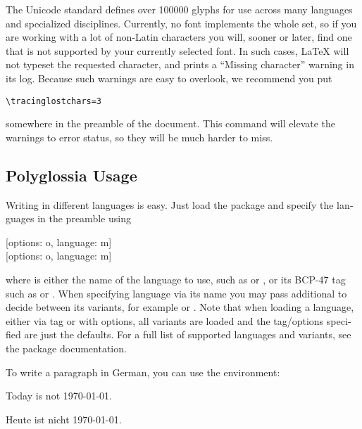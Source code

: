 The Unicode standard defines over \num{100 000} glyphs for use across many
languages and specialized disciplines. Currently, no font implements the whole
set, so if you are working with a lot of non-Latin characters you will, sooner
or later, find one that is not supported by your currently selected font. In
such cases, \LaTeX{} will not typeset the requested character, and prints a
\enquote{Missing character} warning in its log. Because such warnings are easy
to overlook, we recommend you put
\begin{verbatim}
\tracinglostchars=3
\end{verbatim}
somewhere in the preamble of the document. This command will elevate the
warnings to error status, so they will be much harder to miss.

\subsection{Polyglossia Usage}

Writing in different languages is easy. Just load the  package
and specify the languages in the preamble using
\begin{lscommand}
  [options: o, language: m] \\
  [options: o, language: m]
\end{lscommand}
where  is either the name of the language to use, such as
 or , or its BCP-47 tag such as  or
. When specifying language via its name you may pass
additional  to decide between its variants, for example
 or . Note that when loading a
language, either via tag or with options, all variants are loaded and the
tag\slash{}options specified are just the defaults. For a full list of
supported languages and variants, see the  package
documentation.

To write a paragraph in German, you can use the  environment:

\begin{example}
\setdefaultlanguage{english}
Today is not \today.

\begin{german}
  Heute ist nicht \today.
\end{german}
\end{example}

